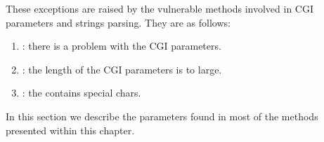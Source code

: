 \documentclass{ozdoc}
\begin{document}
\label{SUBSECTION.CGIEXCEPTIONS}



  \mozartEMPTY
These exceptions are raised by the vulnerable methods involved in CGI parameters and  strings parsing. They are as follows: \mozartEMPTY
\begin{enumerate}
\item{} : there is a problem with the CGI parameters.
\item{} : the length of the CGI parameters is to large.
\item{} : the  contains special chars.
\end{enumerate}


\label{SECTION.INOUTPRMS}



In this section we describe the parameters found in most of the methods presented within this chapter.   \mozartEMPTY


\label{SUBSECTION.INPRMS}
\end{document}
